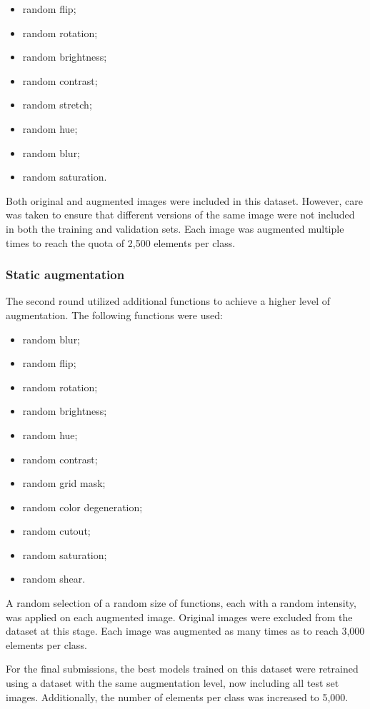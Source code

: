 \documentclass[11pt]{article}
\begin{document}
\begin{itemize}
    \item random flip;
    \item random rotation;
    \item random brightness;
    \item random contrast;
    \item random stretch;
    \item random hue;
    \item random blur;
    \item random saturation.
\end{itemize}

Both original and augmented images were included in this dataset. 
However, care was taken to ensure that different versions of the same image were not included in both the training and validation sets.
Each image was augmented multiple times to reach the quota of 2,500 elements per class.

\subsubsection{Static augmentation}

The second round utilized additional functions to achieve a higher level of augmentation. 
The following functions were used:

\begin{itemize}
    \item random blur;
    \item random flip;
    \item random rotation;
    \item random brightness;
    \item random hue;
    \item random contrast;
    \item random grid mask;
    \item random color degeneration;
    \item random cutout;
    \item random saturation;
    \item random shear.
\end{itemize}

A random selection of a random size of functions, each with a random intensity, was applied on each augmented image.
Original images were excluded from the dataset at this stage. 
Each image was augmented as many times as to reach 3,000 elements per class.

For the final submissions, the best models trained on this dataset were retrained using a dataset with the same augmentation level, now including all test set images. 
Additionally, the number of elements per class was increased to 5,000.
\end{document}
